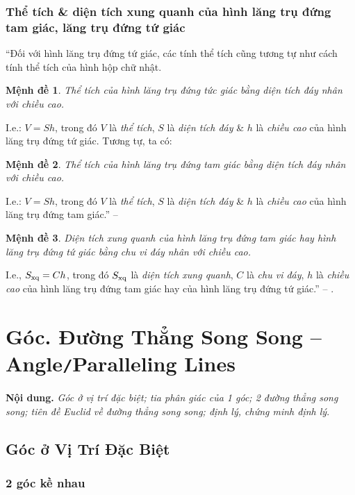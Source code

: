 \documentclass{article}
\numberwithin{equation}{section}
\newtheorem{menhde}{Mệnh đề}[section]
\begin{document}
\subsubsection{Thể tích \& diện tích xung quanh của hình lăng trụ đứng tam giác, lăng trụ đứng tứ giác}
``Đối với hình lăng trụ đứng tứ giác, các tính thể tích cũng tương tự như cách tính thể tích của hình hộp chữ nhật.

\begin{menhde}
	Thể tích của hình lăng trụ đứng tức giác bằng diện tích đáy nhân với chiều cao.
\end{menhde}
I.e.: $V = Sh$, trong đó $V$ là \textit{thể tích}, $S$ là \textit{diện tích đáy} \& $h$ là \textit{chiều cao} của hình lăng trụ đứng tứ giác. Tương tự, ta có:

\begin{menhde}
	Thể tích của hình lăng trụ đứng tam giác bằng diện tích đáy nhân với chiều cao.
\end{menhde}
I.e.: $V = Sh$, trong đó $V$ là \textit{thể tích}, $S$ là \textit{diện tích đáy} \& $h$ là \textit{chiều cao} của hình lăng trụ đứng tam giác.'' -- \cite[p. 84]{SGK_Toan_7_Canh_Dieu_tap_1}

\begin{menhde}
	Diện tích xung quanh của hình lăng trụ đứng tam giác hay hình lăng trụ đứng tứ giác bằng chu vi đáy nhân với chiều cao.
\end{menhde}
I.e., $S_{\rm xq} = Ch$, trong đó $S_{\rm xq}$ là \textit{diện tích xung quanh}, $C$ là \textit{chu vi đáy}, $h$ là \textit{chiều cao} của hình lăng trụ đứng tam giác hay của hình lăng trụ đứng tứ giác.'' -- \cite[p. 85]{SGK_Toan_7_Canh_Dieu_tap_1}.


\section{Góc. Đường Thẳng Song Song -- Angle\texttt{/}Paralleling Lines}
\textbf{Nội dung.} \textit{Góc ở vị trí đặc biệt; tia phân giác của 1 góc; 2 đường thẳng song song; tiên đề Euclid về đường thẳng song song; định lý, chứng minh định lý}.

\subsection{Góc ở Vị Trí Đặc Biệt}

\subsubsection{2 góc kề nhau}
\end{document}
